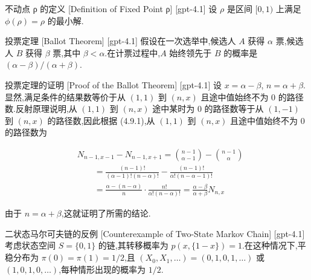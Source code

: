 \documentclass[UTF8]{ctexart}
\begin{document}
    
    
    \begin{dfn}
        {不动点 ρ 的定义}
        [Definition of Fixed Point ρ]
        [gpt-4.1]
        设 $\rho$ 是区间 $[0, 1)$ 上满足 $\phi(\rho) = \rho$ 的最小解.
    \end{dfn}
    
    
    
    \begin{thm}
        {投票定理}
        [Ballot Theorem]
        [gpt-4.1]
        假设在一次选举中,候选人 $A$ 获得 $\alpha$ 票,候选人 $B$ 获得 $\beta$ 票,其中 $\beta < \alpha$.在计票过程中,$A$ 始终领先于 $B$ 的概率是 $(\alpha - \beta) / (\alpha + \beta)$.
    \end{thm}
    
    
    
    \begin{prf}
        {投票定理的证明}
        [Proof of the Ballot Theorem]
        [gpt-4.1]
        设 $x = \alpha - \beta$, $n = \alpha + \beta$.显然,满足条件的结果数等价于从 $(1,1)$ 到 $(n, x)$ 且途中值始终不为 0 的路径数.反射原理说明,从 $(1,1)$ 到 $(n, x)$ 途中某时为 0 的路径数等于从 $(1,-1)$ 到 $(n, x)$ 的路径数,因此根据 (4.9.1),从 $(1,1)$ 到 $(n, x)$ 且途中值始终不为 0 的路径数为

\[
\begin{array}{rl}
& N_{n-1, x-1} - N_{n-1, x+1} = \binom{n-1}{\alpha-1} - \binom{n-1}{\alpha} \\
& \qquad = \frac{(n-1)!}{(\alpha-1)! (n-\alpha)!} - \frac{(n-1)!}{\alpha! (n-\alpha-1)!} \\
& \qquad = \frac{\alpha - (n-\alpha)}{n} \cdot \frac{n!}{\alpha! (n-\alpha)!} = \frac{\alpha - \beta}{\alpha + \beta} N_{n, x}
\end{array}
\]

由于 $n = \alpha + \beta$,这就证明了所需的结论.
    \end{prf}
    
    
    
    \begin{cxmp}
        {二状态马尔可夫链的反例}
        [Counterexample of Two-State Markov Chain]
        [gpt-4.1]
        考虑状态空间 $S = \{0, 1\}$ 的链,其转移概率为 $p(x, \{1 - x\}) = 1$.在这种情况下,平稳分布为 $\pi(0) = \pi(1) = 1/2$,且 $(X_{0}, X_{1}, \ldots) = (0, 1, 0, 1, \ldots)$ 或 $(1, 0, 1, 0, \ldots)$,每种情形出现的概率为 $1/2$.
    \end{cxmp}
    
\end{document}
